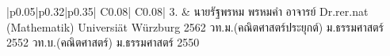 {\begin{center}
\begin{longtable}{|p{}|p{}|p{}|
	C{0.08\textwidth}|
	C{0.08\textwidth}|}
3. &
นายรัฐพรหม พรหมคำ \newline 
อาจารย์	\newline
Dr.rer.nat (Mathematik) \newline Universi\"{a}t W\"{u}rzburg 2562 \newline
วท.ม.(คณิตศาสตร์ประยุกต์) \newline ม.ธรรมศาสตร์ 2552  \newline
วท.บ.(คณิตศาสตร์) \newline ม.ธรรมศาสตร์ 2550


\end{longtable}
\end{center}}
